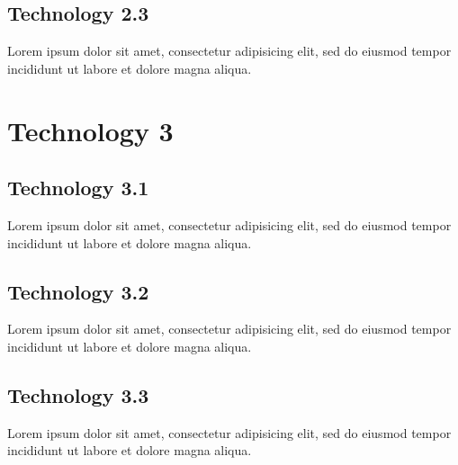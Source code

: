 \documentclass[draftclsnofoot,onecolumn,letterpaper,10pt,compsoc]{IEEEtran}
\begin{document}
	\subsection{Technology 2.3}
	Lorem ipsum dolor sit amet, consectetur adipisicing elit, sed do eiusmod tempor incididunt ut labore et dolore magna aliqua.\cite{Citation}

\section{Technology 3}
	\subsection{Technology 3.1}
	Lorem ipsum dolor sit amet, consectetur adipisicing elit, sed do eiusmod tempor incididunt ut labore et dolore magna aliqua.\cite{Citation}
	\subsection{Technology 3.2}
	Lorem ipsum dolor sit amet, consectetur adipisicing elit, sed do eiusmod tempor incididunt ut labore et dolore magna aliqua.\cite{Citation}
	\subsection{Technology 3.3}
	Lorem ipsum dolor sit amet, consectetur adipisicing elit, sed do eiusmod tempor incididunt ut labore et dolore magna aliqua.\cite{Citation}

\clearpage

{}

\end{document}

